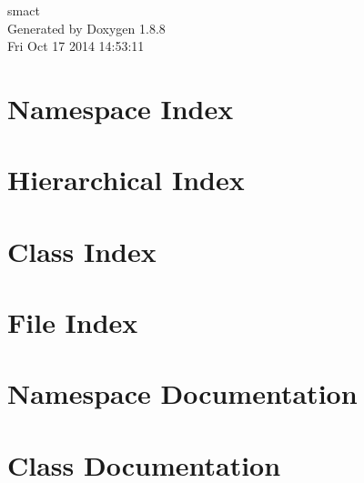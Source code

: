 \documentclass[twoside]{book}
\newcommand{\+}{\discretionary{\mbox{\scriptsize$\hookleftarrow$}}{}{}}
\newcommand{\clearemptydoublepage}{%
  \newpage{\pagestyle{empty}\cleardoublepage}%
}
\begin{document}
\hypersetup{pageanchor=false,
             bookmarks=true,
             bookmarksnumbered=true,
             pdfencoding=unicode
            }
\begin{titlepage}
\vspace*{7cm}
\begin{center}%
{\Large smact }\\
\vspace*{1cm}
{\large Generated by Doxygen 1.8.8}\\
\vspace*{0.5cm}
{\small Fri Oct 17 2014 14:53:11}\\
\end{center}
\end{titlepage}
\clearemptydoublepage
\tableofcontents
\clearemptydoublepage
{}
\hypersetup{pageanchor=true}

\chapter{Namespace Index}

\chapter{Hierarchical Index}

\chapter{Class Index}

\chapter{File Index}

\chapter{Namespace Documentation}















\chapter{Class Documentation}




\end{document}
